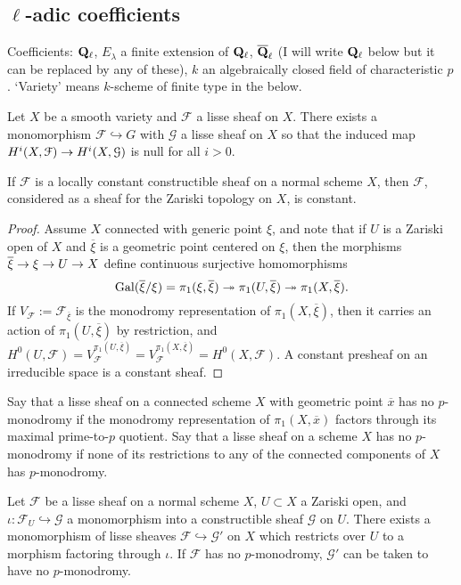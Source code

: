 \documentclass[deligne.tex]{subfiles}
\begin{document}
\subsection{$\ell$-adic coefficients}
Coefficients: $\mathbf{Q}_\ell$, $E_\lambda$ a finite extension of $\mathbf{Q}_\ell$,
$\overline{\mathbf{Q}}_\ell$
(I will write $\mathbf{Q}_\ell$ below but it can be replaced by any of these),
$k$ an algebraically closed field of characteristic $p$.
`Variety' means $k$-scheme of finite type in the below.
\begin{proposition}\label{prop:efface_lisse}
	Let $X$ be a smooth variety and $\mathcal F$ a
	lisse sheaf on $X$. There exists a monomorphism
	$\mathcal F\hookrightarrow G$ with $\mathcal G$ a lisse sheaf on $X$
	so that the induced map $H^i(X,\mathcal F)\rightarrow H^i(X,\mathcal G)$ is null
	for all $i>0$.
\end{proposition}
\begin{lemma}\label{lem:constant_presheaf}
	If $\mathcal F$ is a locally constant constructible sheaf on a normal
	scheme $X$, then $\mathcal F$, considered as a sheaf for the Zariski
	topology on $X$, is constant.
\end{lemma}
\begin{proof}
Assume $X$ connected with generic point $\xi$, and note that if $U$ is a
Zariski open of $X$ and $\overline\xi$ is a geometric point centered on
$\xi$, then the morphisms $\overline\xi\rightarrow\xi\rightarrow U\rightarrow X$ define continuous surjective homomorphisms
\begin{equation*}
	\operatorname{Gal}(\overline\xi/\xi)=\pi_1(\xi,\overline\xi)\twoheadrightarrow
	\pi_1(U,\overline\xi)\twoheadrightarrow\pi_1(X,\overline\xi).
\end{equation*}
If $V_\mathcal F:=\mathcal F_{\overline\xi}$ is the monodromy 
representation of $\pi_1(X,\overline\xi)$, then it carries an action of
$\pi_1(U,\overline\xi)$ by restriction, and
$H^0(U,\mathcal F)=V_\mathcal F^{\pi_1(U,\overline\xi)}=V_\mathcal F^{\pi_1(X,\overline\xi)}=H^0(X,\mathcal F)$.
A constant presheaf on an irreducible space is a constant sheaf.
\end{proof}
	Say that a lisse sheaf on a connected scheme $X$ with geometric point 
$\overline x$ has no $p$-monodromy if the monodromy representation of
$\pi_1(X,\overline x)$ factors through its maximal prime-to-$p$ quotient.
Say that a lisse sheaf on a scheme $X$ has no $p$-monodromy if none of its
restrictions to any of the connected components of $X$ has $p$-monodromy.
\begin{lemma}\label{lem:extend_mono}
	Let $\mathcal F$ be a lisse sheaf on a normal scheme $X$, $U\subset X$ a
	Zariski open, and $\iota:\mathcal F_U\hookrightarrow \mathcal G$ a 
	monomorphism into a constructible sheaf $\mathcal G$ on $U$. There exists 
	a monomorphism of lisse sheaves $\mathcal F\hookrightarrow\mathcal G'$ on
	$X$ which restricts over $U$ to a morphism factoring through $\iota$.
	If $\mathcal F$ has no $p$-monodromy, $\mathcal G'$ can be taken to have
	no $p$-monodromy.
\end{lemma}
\end{document}
